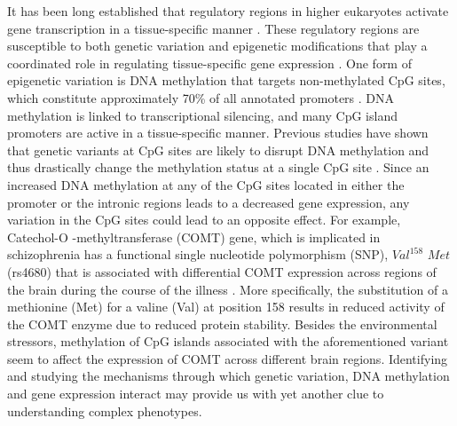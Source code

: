\documentclass[hidelinks]{article}
\begin{document}
It has been long established that regulatory regions in higher eukaryotes activate gene transcription in a tissue-specific manner \cite{enhancer,geyer}. These regulatory regions are susceptible to both genetic variation and epigenetic modifications that play a coordinated role in regulating tissue-specific gene expression \cite{JTBell, gibbs, shoemaker, wrzodek,epigen_reg}. One form of epigenetic variation is DNA methylation that targets non-methylated CpG sites, which constitute approximately 70\% of all annotated promoters \cite{cpg}. DNA methylation is linked to transcriptional silencing, and many CpG island promoters are active in a tissue-specific manner. Previous studies have shown that genetic variants at CpG sites are likely to disrupt DNA methylation and thus drastically change the methylation status at a single CpG site \cite{wagner,hellman,gen_epigen_tissue}. Since an increased DNA methylation at any of the CpG sites located in either the promoter or the intronic regions leads to a decreased gene expression, any variation in the CpG sites could lead to an opposite effect. For example, Catechol-O -methyltransferase (COMT) gene, which is implicated in schizophrenia has a functional single nucleotide polymorphism (SNP), $Val^{158}$ $Met$ (rs4680) that is associated with differential COMT expression across regions of the brain during the course of the illness \cite{comt1}. More specifically, the substitution of a methionine (Met) for a valine (Val) at position 158 results in reduced activity of the COMT enzyme due to reduced protein stability. Besides the environmental stressors, methylation of CpG islands associated with the aforementioned variant seem to affect the expression of COMT across different brain regions\cite{comt1}. Identifying and studying the mechanisms through which genetic variation, DNA methylation and gene expression interact may provide us with yet another clue to understanding complex phenotypes. 
\end{document}
